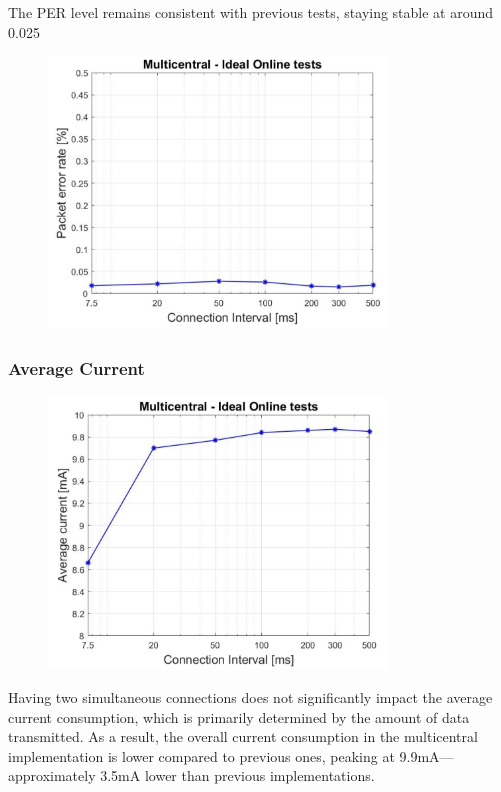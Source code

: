 \documentclass{Configuration_Files/PoliMi3i_thesis}
\begin{document}
The PER level remains consistent with previous tests, staying stable at around 0.025%

\begin{figure}[h!]
    \centering
    \includegraphics[width=0.8\textwidth]{Results Manuel/figure28}
    \label{fig:figure1}
\end{figure}

\subsubsection*{Average Current}

\begin{figure}[h!]
    \centering
    \includegraphics[width=0.8\textwidth]{Results Manuel/figure29}
    \label{fig:figure1}
\end{figure}

Having two simultaneous connections does not significantly impact the average current consumption, which is primarily determined by the amount of data transmitted. As a result, the overall current consumption in the multicentral implementation is lower compared to previous ones, peaking at 9.9mA—approximately 3.5mA lower than previous implementations.
\end{document}
